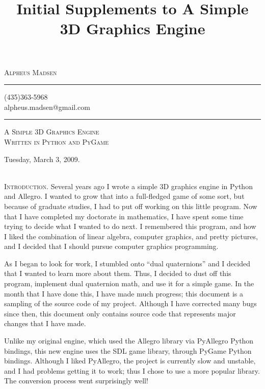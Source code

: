 \documentclass[10pt]{article}
\title{Initial Supplements to A Simple 3D Graphics Engine}
\author{\headerstuff}
\date{}
\makeatletter
\newcommand{\titleize}[1]{
   \begin{center}
       \Large \textsc{#1} \normalsize \\
   \end{center}
}
\newcommand{\normaltitleize}[1]{\mbox{}\\ \textsc{#1} \normalsize}
\newcommand{\headerstuff}{
   \begin{center}
   \textsc{\Large{Alpheus Madsen}}

   \rule{1in}{.01in}

   (435)363-5968 \\

   alpheus.madsen@gmail.com

   \rule{2in}{.01in}
   \end{center}
}
\makeatother
\begin{document}

\headerstuff

\titleize{A Simple 3D Graphics Engine\\Written in Python and PyGame}

\begin{center}
   Tuesday, March 3, 2009.
\end{center}

\normaltitleize{Introduction.}  Several years ago I wrote a simple 3D graphics engine in Python and Allegro.  I wanted to grow that into a full-fledged game of some sort, but because of graduate studies, I had to put off working on this little program.  Now that I have completed my doctorate in mathematics, I have spent some time trying to decide what I wanted to do next.  I remembered this program, and how I liked the combination of linear algebra, computer graphics, and pretty pictures, and I decided that I should pursue computer graphics programming.

As I began to look for work, I stumbled onto ``dual quaternions'' and I decided that I wanted to learn more about them.  Thus, I decided to dust off this program, implement dual quaternion math, and use it for a simple game.  In the month that I have done this, I have made much progress; this document is a sampling of the source code of my project.  Although I have corrected many bugs since then, this document only contains source code that represents major changes that I have made.

Unlike my original engine, which used the Allegro library via PyAllegro Python bindings, this new engine uses the SDL game library, through PyGame Python bindings.  Although I liked PyAllegro, the project is currently slow and unstable, and I had problems getting it to work; thus I chose to use a more popular library.  The conversion process went surprisingly well!
\end{document}

